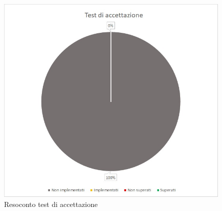 \begin{figure} [H]
	\centering
	\includegraphics[scale=1]{Img/TA}
	\caption{Resoconto test di accettazione}\label{}
\end{figure}
\normalsize
\renewcommand{\arraystretch}{1}
\newpage

